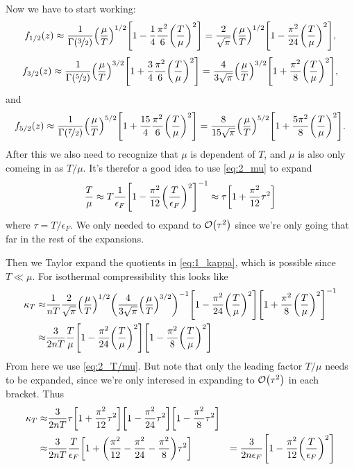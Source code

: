 \documentclass[11pt,letter, swedish, english
]{article}
\begin{document}
Now we have to start working:
\begin{equation}\label{eq:1_1/2}
f_{1/2}(z)\approx\frac{1}{\Gamma(\nicefrac{3}{2})}\qty(\frac{\mu}{T})^{1/2}
\qty[
1-\frac{1}{4}\frac{\pi^2}{6}\qty(\frac{T}{\mu})^2]
=\frac{2}{\sqrt{\pi}}\qty(\frac{\mu}{T})^{1/2}
\qty[
1-\frac{\pi^2}{24}\qty(\frac{T}{\mu})^2],
\end{equation}
\begin{equation}\label{eq:1_3/2}
f_{3/2}(z)\approx\frac{1}{\Gamma(\nicefrac{5}{2})}\qty(\frac{\mu}{T})^{3/2}
\qty[
1+\frac{3}{4}\frac{\pi^2}{6}\qty(\frac{T}{\mu})^2]
=\frac{4}{3\sqrt{\pi}}\qty(\frac{\mu}{T})^{3/2}
\qty[1+\frac{\pi^2}{8}\qty(\frac{T}{\mu})^2],
\end{equation}
and 
\begin{equation}\label{eq:1_5/2}
f_{5/2}(z)\approx\frac{1}{\Gamma(\nicefrac{7}{2})}\qty(\frac{\mu}{T})^{5/2}
\qty[
1+\frac{15}{4}\frac{\pi^2}{6}\qty(\frac{T}{\mu})^2]
=\frac{8}{15\sqrt{\pi}}\qty(\frac{\mu}{T})^{5/2}
\qty[1+\frac{5\pi^2}{8}\qty(\frac{T}{\mu})^2].
\end{equation}
After this we also need to recognize that $\mu$ is dependent of
$T$, and $\mu$ is also only comeing in as $T/\mu$. It's therefor a
good idea to use \eqref{eq:2_mu} to expand
\begin{equation}\label{eq:2_T/mu}
\frac{T}{\mu}\approx T \frac{1}{\epsilon_F}\qty[ 1
-\frac{\pi^2}{12}\qty(\frac{T}{\epsilon_F})^2]^{-1}
\approx\tau\qty[1
+\frac{\pi^2}{12}\tau^2]
\end{equation}
where $\tau=T/\epsilon_F$. We only needed to expand to
$\order{\tau^2}$ since we're only going that far in the rest of the
expansions. 

Then we Taylor expand the quotients in \eqref{eq:1_kappa},
which is possible since $T\ll\mu$. 
For isothermal compressibility this looks like
\begin{equation}
\begin{aligned}
\kappa_T\approx& \frac{1}{nT} 
\frac{2}{\sqrt{\pi}}\qty(\frac{\mu}{T})^{1/2}
\qty(\frac{4}{3\sqrt{\pi}}\qty(\frac{\mu}{T})^{3/2})^{-1}
\qty[
1-\frac{\pi^2}{24}\qty(\frac{T}{\mu})^2]
\qty[
1+\frac{\pi^2}{8}\qty(\frac{T}{\mu})^2]^{-1}\\
\approx&
 \frac{3}{2nT}\frac{T}{\mu}
\qty[
1-\frac{\pi^2}{24}\qty(\frac{T}{\mu})^2]
\qty[
1-\frac{\pi^2}{8}\qty(\frac{T}{\mu})^2]\\
\end{aligned}
\end{equation}
From here we use \eqref{eq:2_T/mu}. But note that only the leading
factor $T/\mu$ needs to be expanded, since we're only interesed in
expanding to $\order{\tau^2}$ in each bracket. Thus
\begin{equation}
\begin{aligned}
\kappa_T\approx& \frac{3}{2nT}
\tau\qty[1 +\frac{\pi^2}{12}\tau^2]
\qty[1 -\frac{\pi^2}{24}\tau^2]
\qty[1 -\frac{\pi^2}{8}\tau^2]\\
\approx& \frac{3}{2nT}
\frac{T}{\epsilon_F}\qty[1 +
\qty(\frac{\pi^2}{12}-\frac{\pi^2}{24}-\frac{\pi^2}{8})
\tau^2] 
&=\frac{3}{2n\epsilon_F}
\qty[1 - \frac{\pi^2}{12}\qty(\frac{T}{\epsilon_F})^2]
\end{aligned}
\end{equation}
\end{document}
